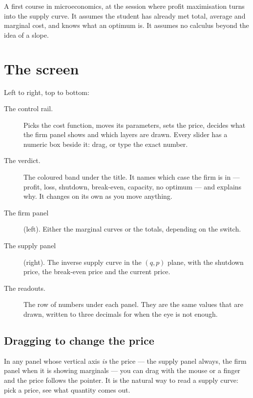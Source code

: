 \documentclass[11pt,a4paper]{appletmanual}
\begin{document}
A first course in microeconomics, at the session where profit maximisation
turns into the supply curve. It assumes the student has already met total,
average and marginal cost, and knows what an optimum is. It assumes no calculus
beyond the idea of a slope.



\section{The screen}


Left to right, top to bottom:

\begin{description}
\item[The control rail.] Picks the cost function, moves its parameters, sets
  the price, decides what the firm panel shows and which layers are drawn.
  Every slider has a numeric box beside it: drag, or type the exact number.
\item[The verdict.] The coloured band under the title. It names which case the
  firm is in --- profit, loss, shutdown, break-even, capacity, no optimum ---
  and explains why. It changes on its own as you move anything.
\item[The firm panel] (left). Either the marginal curves or the totals,
  depending on the  switch.
\item[The supply panel] (right). The inverse supply curve in the $(q, p)$ plane,
  with the shutdown price, the break-even price and the current price.
\item[The readouts.] The row of numbers under each panel. They are the same
  values that are drawn, written to three decimals for when the eye is not
  enough.
\end{description}

\subsection{Dragging to change the price}

In any panel whose vertical axis \emph{is} the price --- the supply panel
always, the firm panel when it is showing marginals --- you can drag with the
mouse or a finger and the price follows the pointer. It is the natural way to
read a supply curve: pick a price, see what quantity comes out.
\end{document}
